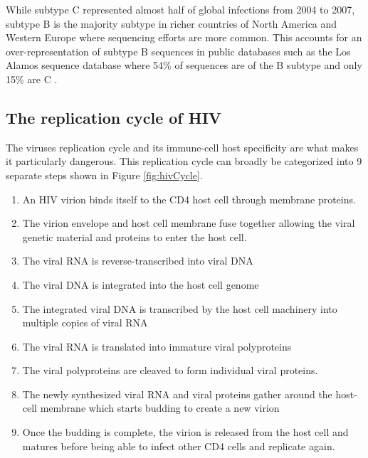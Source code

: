 \documentclass[
  11pt,
  twoside,
  BCOR=10mm,
  listof=totoc]{scrbook}
\begin{document}
While subtype C represented almost half of global infections from 2004 to 2007, subtype B is the majority subtype in richer countries of North America and Western Europe \autocite{hemelaarGlobalTrendsMolecular2011} where sequencing efforts are more common. This accounts for an over-representation of subtype B sequences in public databases such as the Los Alamos sequence database where 54\% of sequences are of the B subtype and only 15\% are C \autocite{DistributionAllHIV1}.

\hypertarget{the-replication-cycle-of-hiv}{%
\subsection{The replication cycle of HIV}\label{the-replication-cycle-of-hiv}}

The viruses replication cycle and its immune-cell host specificity are what makes it particularly dangerous. This replication cycle can broadly be categorized into 9 separate steps \autocite{freedHIV1Replication2001,fergusonHIV1ReplicationCycle2002} shown in Figure \ref{fig:hivCycle}.

\begin{enumerate}
\def\labelenumi{\arabic{enumi}.}
\item
  An HIV virion binds itself to the CD4 host cell through membrane proteins.
\item
  The virion envelope and host cell membrane fuse together allowing the viral genetic material and proteins to enter the host cell.
\item
  The viral RNA is reverse-transcribed into viral DNA
\item
  The viral DNA is integrated into the host cell genome
\item
  The integrated viral DNA is transcribed by the host cell machinery into multiple copies of viral RNA
\item
  The viral RNA is translated into immature viral polyproteins
\item
  The viral polyproteins are cleaved to form individual viral proteins.
\item
  The newly synthesized viral RNA and viral proteins gather around the host-cell membrane which starts budding to create a new virion
\item
  Once the budding is complete, the virion is released from the host cell and matures before being able to infect other CD4 cells and replicate again.
\end{enumerate}
\end{document}
